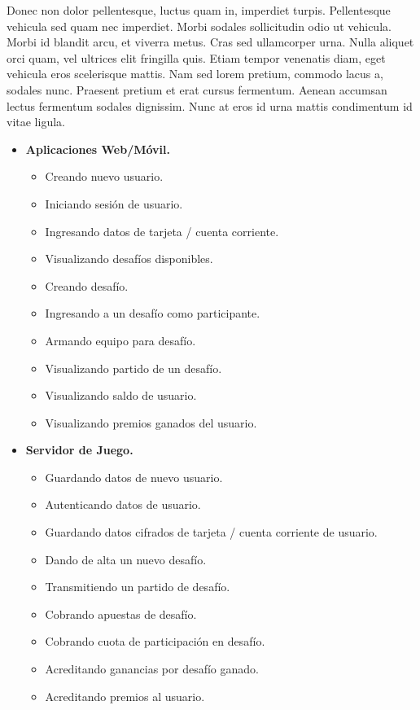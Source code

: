 \documentclass[a4paper, 10pt, twoside]{article}
\begin{document}
Donec non dolor pellentesque, luctus quam in, imperdiet turpis. Pellentesque vehicula sed quam nec imperdiet. Morbi sodales sollicitudin odio ut vehicula. Morbi id blandit arcu, et viverra metus. Cras sed ullamcorper urna. Nulla aliquet orci quam, vel ultrices elit fringilla quis. Etiam tempor venenatis diam, eget vehicula eros scelerisque mattis. Nam sed lorem pretium, commodo lacus a, sodales nunc. Praesent pretium et erat cursus fermentum. Aenean accumsan lectus fermentum sodales dignissim. Nunc at eros id urna mattis condimentum id vitae ligula.

\begin{itemize}

  \item \textbf{Aplicaciones Web/Móvil.}
  \begin{itemize}
    \item Creando nuevo usuario.
    \item Iniciando sesión de usuario.
    \item Ingresando datos de tarjeta / cuenta corriente.
    \item Visualizando desafíos disponibles.
    \item Creando desafío.
    \item Ingresando a un desafío como participante.
    \item Armando equipo para desafío.
    \item Visualizando partido de un desafío.
    \item Visualizando saldo de usuario.
    \item Visualizando premios ganados del usuario.
  \end{itemize}

  \item \textbf{Servidor de Juego.}
  \begin{itemize}
    \item Guardando datos de nuevo usuario.
    \item Autenticando datos de usuario.
    \item Guardando datos cifrados de tarjeta / cuenta corriente de usuario.
    \item Dando de alta un nuevo desafío.
    \item Transmitiendo un partido de desafío.
    \item Cobrando apuestas de desafío.
    \item Cobrando cuota de participación en desafío.
    \item Acreditando ganancias por desafío ganado.
    \item Acreditando premios al usuario.
  \end{itemize}


\end{itemize}
\end{document}
